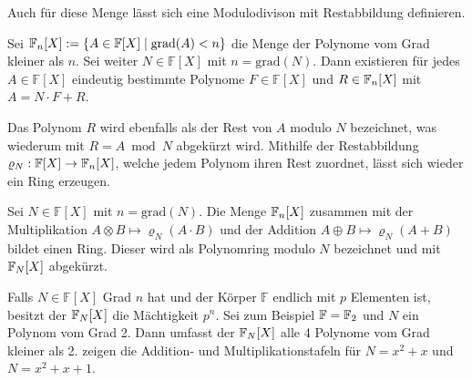 Auch für diese Menge lässt sich eine Modulodivison mit Restabbildung definieren. 

\begin{satz}
    Sei $\field{n} {[X]} := \{A \in \mathbb{F} {[X]} \mid \mathrm{grad}(A) < n\}$ die Menge der Polynome vom Grad kleiner als $n$. Sei weiter $N \in \mathbb{F} {[X]}$ mit $n = \mathrm{grad}(N)$. Dann existieren für jedes $A \in \mathbb{F} {[X]}$ eindeutig bestimmte Polynome $F \in \mathbb{F} {[X]}$ und $R \in \field{n} {[X]}$ mit $A = N \cdot F + R$.
\end{satz}


Das Polynom $R$ wird ebenfalls als der Rest von $A$ modulo $N$ bezeichnet, was wiederum mit $R = A \bmod N$ abgekürzt wird. Mithilfe der Restabbildung $\varrho_N : \mathbb{F} {[X]} \rightarrow \field{n} {[X]}$, welche jedem Polynom ihren Rest zuordnet, lässt sich wieder ein Ring erzeugen.

\begin{satz}
    Sei $N \in \mathbb{F} {[X]}$ mit $n = \mathrm{grad}(N)$. Die Menge $\field{n} {[X]}$ zusammen mit der Multiplikation $A \otimes B \mapsto \varrho_N(A \cdot B)$ und der Addition $A \oplus B \mapsto \varrho_N(A + B)$ bildet einen Ring. Dieser wird als Polynomring modulo $N$ bezeichnet und mit $\field{N} {[X]}$ abgekürzt.
\end{satz}

Falls $N \in \mathbb{F} {[X]}$ Grad $n$ hat und der Körper $\mathbb{F}$ endlich mit $p$ Elementen ist, besitzt der $\field{N} {[X]}$ die Mächtigkeit $p^n$.
Sei zum Beispiel $\mathbb{F} = \field{2}$ und $N$ ein Polynom vom Grad 2. Dann umfasst der $\field{N} {[X]}$ alle 4 Polynome vom Grad kleiner als 2.  zeigen die Addition- und Multiplikationstafeln für $N=x^2 + x$ und $N= x^2 + x + 1$.

